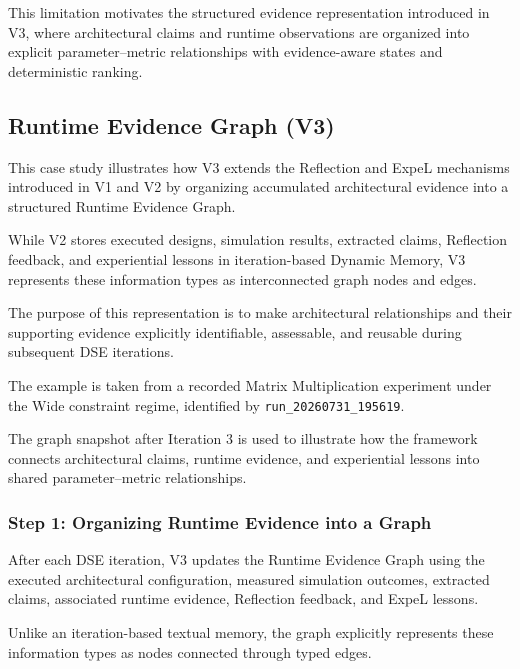This limitation motivates the structured
evidence representation introduced in V3,
where architectural claims and runtime
observations are organized into explicit
parameter--metric relationships with
evidence-aware states and deterministic
ranking.


\subsection{Runtime Evidence Graph (V3)}
\label{app:p4_v3_case_study}

This case study illustrates how V3 extends the
Reflection and ExpeL mechanisms introduced in V1
and V2 by organizing accumulated architectural
evidence into a structured Runtime Evidence Graph.

While V2 stores executed designs, simulation
results, extracted claims, Reflection feedback,
and experiential lessons in iteration-based
Dynamic Memory, V3 represents these information
types as interconnected graph nodes and edges.

The purpose of this representation is to make
architectural relationships and their supporting
evidence explicitly identifiable, assessable,
and reusable during subsequent DSE iterations.

The example is taken from a recorded Matrix
Multiplication experiment under the Wide
constraint regime, identified by
\texttt{run\_20260731\_195619}.

The graph snapshot after Iteration 3 is used
to illustrate how the framework connects
architectural claims, runtime evidence, and
experiential lessons into shared
parameter--metric relationships.



\subsubsection{Step 1: Organizing Runtime Evidence into a Graph}

After each DSE iteration, V3 updates the
Runtime Evidence Graph using the executed
architectural configuration, measured
simulation outcomes, extracted claims,
associated runtime evidence, Reflection
feedback, and ExpeL lessons.

Unlike an iteration-based textual memory,
the graph explicitly represents these
information types as nodes connected
through typed edges.

